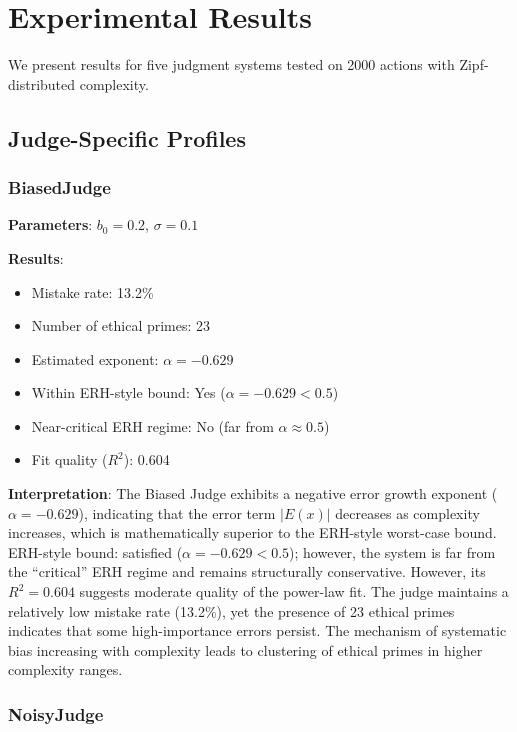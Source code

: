 \documentclass[12pt,a4paper]{article}
\theoremstyle{definition}
\theoremstyle{remark}
\begin{document}
\section{Experimental Results}
\label{sec:results}

We present results for five judgment systems tested on 2000 actions with Zipf-distributed complexity.

\subsection{Judge-Specific Profiles}

\subsubsection{BiasedJudge}

\textbf{Parameters}: $b_0 = 0.2$, $\sigma = 0.1$

\textbf{Results}:
\begin{itemize}
    \item Mistake rate: 13.2\%
    \item Number of ethical primes: 23
    \item Estimated exponent: $\alpha = -0.629$
    \item Within ERH-style bound: Yes ($\alpha = -0.629 < 0.5$)
    \item Near-critical ERH regime: No (far from $\alpha \approx 0.5$)
    \item Fit quality ($R^2$): 0.604
\end{itemize}

\textbf{Interpretation}: The Biased Judge exhibits a negative error growth exponent ($\alpha = -0.629$), indicating that the error term $|E(x)|$ decreases as complexity increases, which is mathematically superior to the ERH-style worst-case bound. ERH-style bound: satisfied ($\alpha = -0.629 < 0.5$); however, the system is far from the ``critical'' ERH regime and remains structurally conservative. However, its $R^2 = 0.604$ suggests moderate quality of the power-law fit. The judge maintains a relatively low mistake rate (13.2\%), yet the presence of 23 ethical primes indicates that some high-importance errors persist. The mechanism of systematic bias increasing with complexity leads to clustering of ethical primes in higher complexity ranges.

\subsubsection{NoisyJudge}
\end{document}
